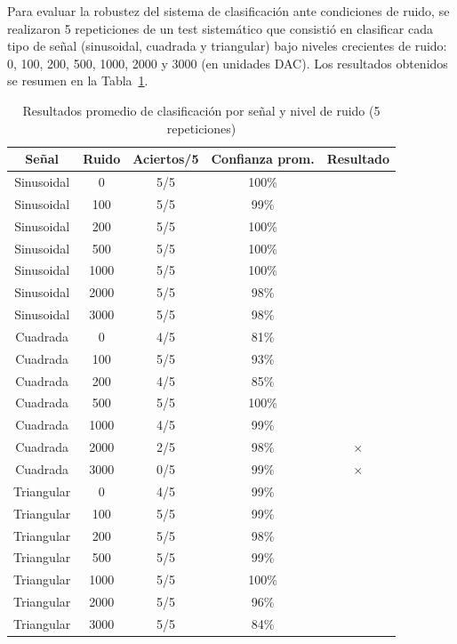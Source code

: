 \documentclass[a4paper,11pt]{article}
\begin{document}
Para evaluar la robustez del sistema de clasificación ante condiciones de ruido, se realizaron 5 repeticiones de un test sistemático que consistió en clasificar cada tipo de señal (sinusoidal, cuadrada y triangular) bajo niveles crecientes de ruido: 0, 100, 200, 500, 1000, 2000 y 3000 (en unidades DAC). Los resultados obtenidos se resumen en la Tabla~\ref{tab:resultados_clasificacion}.

\begin{table}[H]
	\centering
	\caption{Resultados promedio de clasificación por señal y nivel de ruido (5 repeticiones)}
	\label{tab:resultados_clasificacion}
	\begin{tabular}{|c|c|c|c|c|}
		\hline
		\textbf{Señal} & \textbf{Ruido} & \textbf{Aciertos/5} & \textbf{Confianza prom.} & \textbf{Resultado} \\
		\hline
		Sinusoidal & 0    & 5/5 & 100\% & \checkmark \\
		Sinusoidal & 100  & 5/5 & 99\%  & \checkmark \\
		Sinusoidal & 200  & 5/5 & 100\% & \checkmark \\
		Sinusoidal & 500  & 5/5 & 100\% & \checkmark \\
		Sinusoidal & 1000 & 5/5 & 100\% & \checkmark \\
		Sinusoidal & 2000 & 5/5 & 98\%  & \checkmark \\
		Sinusoidal & 3000 & 5/5 & 98\%  & \checkmark \\
		\hline
		Cuadrada   & 0    & 4/5 & 81\%  & \checkmark \\
		Cuadrada   & 100  & 5/5 & 93\%  & \checkmark \\
		Cuadrada   & 200  & 4/5 & 85\%  & \checkmark \\
		Cuadrada   & 500  & 5/5 & 100\% & \checkmark \\
		Cuadrada   & 1000 & 4/5 & 99\%  & \checkmark \\
		Cuadrada   & 2000 & 2/5 & 98\%  & $\times$   \\
		Cuadrada   & 3000 & 0/5 & 99\%  & $\times$   \\
		\hline
		Triangular & 0    & 4/5 & 99\%  & \checkmark \\
		Triangular & 100  & 5/5 & 99\%  & \checkmark \\
		Triangular & 200  & 5/5 & 98\%  & \checkmark \\
		Triangular & 500  & 5/5 & 99\%  & \checkmark \\
		Triangular & 1000 & 5/5 & 100\% & \checkmark \\
		Triangular & 2000 & 5/5 & 96\%  & \checkmark \\
		Triangular & 3000 & 5/5 & 84\%  & \checkmark \\
		\hline
	\end{tabular}
\end{table}
\end{document}
